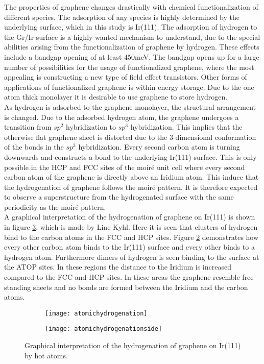 The properties of graphene changes drastically with chemical functionalization of different species. The adsorption of any species is highly determined by the underlying surface, which in this study is Ir(111). The adsorption of hydrogen to the Gr/Ir surface is a highly wanted mechanism to understand, due to the special abilities arising from the functionalization of graphene by hydrogen. These effects include a bandgap opening of at least 450meV.\cite{e40134a5a1aa4cb69ba806c02cd8e327} The bandgap opens up for a large number of possibilities for the usage of functionalized graphene, where the most appealing is constructing a new type of field effect transistors. Other forms of applications of functionalized graphene is within energy storage. Due to the one atom thick monolayer it is desirable to use graphene to store hydrogen.\\
As hydrogen is adsorbed to the graphene monolayer, the structural arrangement is changed. Due to the adsorbed hydrogen atom, the graphene undergoes a transition from $sp^2$ hybridization to $sp^3$ hybridization. This implies that the otherwise flat graphene sheet is distorted due to the 3-dimensional conformation of the bonds in the $sp^3$ hybridization. Every second carbon atom is turning downwards and constructs a bond to the underlying Ir(111) surface. This is only possible in the HCP and FCC sites of the moiré unit cell where every second carbon atom of the graphene is directly above an Iridium atom. This induce that the hydrogenation of graphene follows the moiré pattern.\cite{PhysRevB.93.115403} It is therefore expected to observe a superstructure from the hydrogenated surface with the same periodicity as the moiré pattern.\\
A graphical interpretation of the hydrogenation of graphene on Ir(111) is shown in figure \ref{hydrogenation:all}, which is made by Line Kyhl. Here it is seen that clusters of hydrogen bind to the carbon atoms in the FCC and HCP sites. Figure \ref{hydrogenationside} demonstrates how every other carbon atom binds to the Ir(111) surface and every other binds to a hydrogen atom. Furthermore dimers of hydrogen is seen binding to the surface at the ATOP sites. In these regions the distance to the Iridium is increased compared to the FCC and HCP sites. In these areas the graphene resemble free standing sheets and no bonds are formed between the Iridium and the carbon atoms.

\begin{figure}[H]
  \centering
  \begin{subfigure}[b]{0.4\textwidth}
       \texttt{[image: atomichydrogenation]}
       \caption{}
       \label{hydrogenation}
   \end{subfigure}
   \begin{subfigure}[b]{0.4\textwidth}
        \texttt{[image: atomichydrogenationside]}
        \caption{}
        \label{hydrogenationside}
    \end{subfigure}
  \caption{Graphical interpretation of the hydrogenation of graphene on Ir(111) by hot atoms.\cite{Line}}
  \label{hydrogenation:all}
\end{figure}



